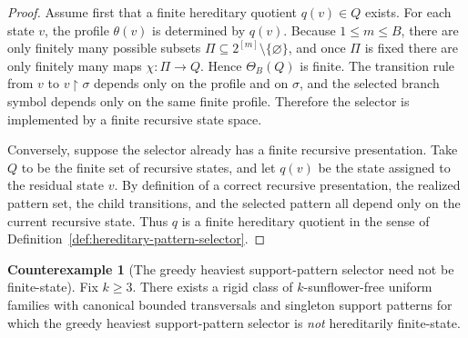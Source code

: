 \documentclass[11pt]{article}
\theoremstyle{definition}
\newtheorem{counterexample}[theorem]{Counterexample}
\newcommand{\1}{\mathbf{1}}
\begin{document}
\begin{proof}
Assume first that a finite hereditary quotient $q(v)\in Q$ exists.
For each state $v$, the profile $\theta(v)$ is determined by $q(v)$.
Because $1\le m\le B$, there are only finitely many possible subsets $\Pi\subseteq 2^{[m]}\setminus\{\varnothing\}$, and once $\Pi$ is fixed there are only finitely many maps $\chi:\Pi\to Q$.
Hence $\Theta_B(Q)$ is finite.
The transition rule from $v$ to $v\!\restriction \sigma$ depends only on the profile and on $\sigma$, and the selected branch symbol depends only on the same finite profile.
Therefore the selector is implemented by a finite recursive state space.

Conversely, suppose the selector already has a finite recursive presentation.
Take $Q$ to be the finite set of recursive states, and let $q(v)$ be the state assigned to the residual state $v$.
By definition of a correct recursive presentation, the realized pattern set, the child transitions, and the selected pattern all depend only on the current recursive state.
Thus $q$ is a finite hereditary quotient in the sense of Definition~\ref{def:hereditary-pattern-selector}.
\end{proof}

\begin{counterexample}[The greedy heaviest support-pattern selector need not be finite-state]\label{ce:greedy-support-branch}
Fix $k\ge 3$.
There exists a rigid class of $k$-sunflower-free uniform families with canonical bounded transversals and singleton support patterns for which the greedy heaviest support-pattern selector is \emph{not} hereditarily finite-state.
\end{counterexample}
\end{document}
